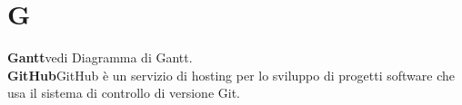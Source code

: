 \newpage
\section{G}\label{l:G}
\textbf{Gantt}\newline vedi Diagramma di Gantt.\\
\newline
\textbf{GitHub}\newline GitHub è un servizio di hosting per lo sviluppo di progetti software che usa il sistema di controllo di versione Git.